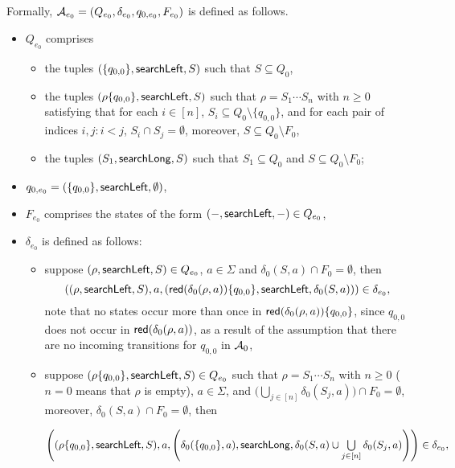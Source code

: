 Formally, $\mathcal{A}_{e_0}=(Q_{e_0}, \delta_{e_0}, q_{0,e_0}, F_{e_0})$ is defined as follows.
\begin{itemize}
	\item $Q_{e_0}$ comprises 
	\begin{itemize}
		\item the tuples $(\{q_{0,0}\}, \mathsf{searchLeft}, S)$ such that $S \subseteq Q_0$,
		\item the tuples $(\rho \{q_{0,0}\}, \mathsf{searchLeft}, S)$ such that  $\rho = S_1 \cdots S_n$ with $n \ge 0$ satisfying that for each $i \in [n]$, $S_i \subseteq Q_0 \setminus \{q_{0,0}\}$, and for each pair of indices $i, j: i < j$, $S_i \cap S_j = \emptyset$, moreover, $S \subseteq Q_0 \setminus F_0$, 
		\item the tuples $(S_1, \mathsf{searchLong}, S)$ such that $S_1 \subseteq Q_0$ and $S \subseteq Q_0 \setminus F_0$;
	\end{itemize}
	\item $q_{0,e_0}= (\{q_{0,0}\}, \mathsf{searchLeft}, \emptyset)$,
	\item $F_{e_0}$ comprises the states of the form $(-, \mathsf{searchLeft}, -) \in Q_{e_0}$,
	\item $\delta_{e_0}$ is defined as follows: 
	\begin{itemize}
		\item suppose $(\rho, \mathsf{searchLeft}, S) \in Q_{e_0}$, $a \in \Sigma$ and $\delta_0(S,a) \cap F_0 = \emptyset$, then 
		$$\left((\rho, \mathsf{searchLeft}, S), a, \left(\mathsf{red}(\delta_0(\rho,a)) \{q_{0,0}\}, \mathsf{searchLeft}, \delta_0(S,a) \right) \right) \in \delta_{e_0},$$ 
		note that no states occur more than once in $\mathsf{red}(\delta_0(\rho,a)) \{q_{0,0}\}$, since $q_{0,0}$ does not occur in $\mathsf{red}(\delta_0(\rho,a))$, as a result of the assumption that there are no incoming transitions for $q_{0,0}$ in $\mathcal{A}_0$,
		\item suppose $(\rho \{q_{0,0}\}, \mathsf{searchLeft}, S) \in Q_{e_0}$ such that $\rho = S_1 \cdots S_n$ with $n \ge 0$ ($n = 0$ means that $\rho$ is empty), $a \in \Sigma$, and $\big(\bigcup \limits_{j \in [n]} \delta_0(S_j, a) \big) \cap F_0 = \emptyset$, moreover, $\delta_0(S,a) \cap F_0 = \emptyset$, then
		
		\medskip
		$\left((\rho \{q_{0,0}\}, \mathsf{searchLeft}, S), a, \left(\delta_0(\{q_{0,0}\}, a), \mathsf{searchLong}, \delta_0(S, a) \cup \bigcup \limits_{j \in [n]} \delta_0(S_j, a) \right) \right) \in \delta_{e_0},$
		

\end{itemize}
\end{itemize}
